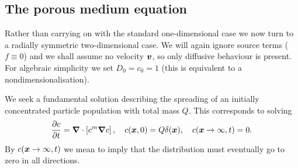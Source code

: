 \documentclass[main.tex]{subfiles}
\begin{document}
\subsection{The porous medium equation}

Rather than carrying on with the standard one-dimensional case we now turn to a radially symmetric two-dimensional case. We will again ignore source terms ($f\equiv 0$) and we shall assume no velocity $\v{v}$, so only diffusive behaviour is present. For algebraic simplicity we set $D_0=c_0=1$ (this is equivalent to a nondimensionalisation).

We seek a fundamental solution describing the spreading of an initially concentrated particle population with total mass $Q$. This corresponds to solving
\begin{equation}
\pd{c}{t} = \vdel\cdot\left[c^m \vgrad c\right],\quad c(\v{x},0) = Q\delta(\v{x}), \quad c(\v{x} \to \infty,t)=0.
\label{radial-diff-eqn}
\end{equation}
By $c(\v{x} \to \infty,t)$ we mean to imply that the distribution must eventually go to zero in all directions.
\end{document}
